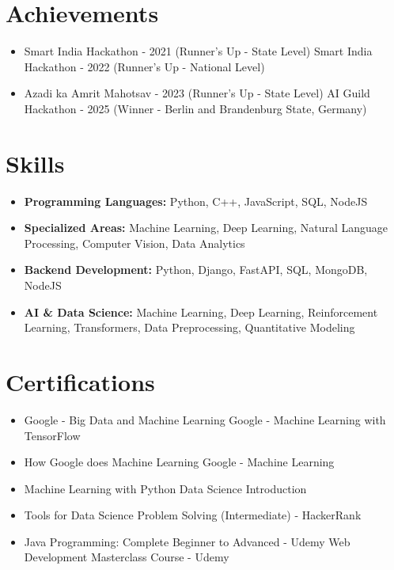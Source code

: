 \documentclass[a4paper,10pt]{article}
\begin{document}
\section*{Achievements}
\begin{itemize}
\item Smart India Hackathon - 2021 (Runner's Up - State Level) \hfill Smart India Hackathon - 2022 (Runner's Up - National Level)
\item Azadi ka Amrit Mahotsav - 2023 (Runner's Up - State Level) \hfill AI Guild Hackathon - 2025 (Winner - Berlin and Brandenburg State, Germany)
\end{itemize}

\section*{Skills}
\begin{itemize}
  \item \textbf{Programming Languages:} Python, C++, JavaScript, SQL, NodeJS
  \item \textbf{Specialized Areas:} Machine Learning, Deep Learning, Natural Language Processing, Computer Vision, Data Analytics
  \item \textbf{Backend Development:} Python, Django, FastAPI, SQL, MongoDB, NodeJS
  \item \textbf{AI \& Data Science:} Machine Learning, Deep Learning, Reinforcement Learning, Transformers, Data Preprocessing, Quantitative Modeling
\end{itemize}

\section*{Certifications}
\begin{itemize}
\item Google - Big Data and Machine Learning \hfill Google - Machine Learning with TensorFlow
\item How Google does Machine Learning \hfill Google - Machine Learning
\item Machine Learning with Python \hfill Data Science Introduction
\item Tools for Data Science \hfill Problem Solving (Intermediate) - HackerRank
\item Java Programming: Complete Beginner to Advanced - Udemy \hfill Web Development Masterclass Course - Udemy
\end{itemize}
\end{document}
